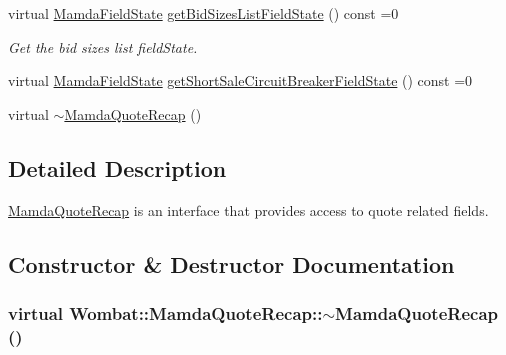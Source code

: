 \begin{CompactItemize}
virtual \hyperlink{namespaceWombat_93aac974f2ab713554fd12a1fa3b7d2a}{Mamda\-Field\-State} \hyperlink{classWombat_1_1MamdaQuoteRecap_8f599613010d229d59ab812227aa3373}{get\-Bid\-Sizes\-List\-Field\-State} () const =0
\begin{CompactList}\small\item\em Get the bid sizes list field\-State. \item\end{CompactList}\item 
virtual \hyperlink{namespaceWombat_93aac974f2ab713554fd12a1fa3b7d2a}{Mamda\-Field\-State} \hyperlink{classWombat_1_1MamdaQuoteRecap_d36a516b29285e3f16b488fbe7e5ba1a}{get\-Short\-Sale\-Circuit\-Breaker\-Field\-State} () const =0
\item 
virtual \hyperlink{classWombat_1_1MamdaQuoteRecap_b89d703efc60fa6edcf108860e922ba3}{$\sim$Mamda\-Quote\-Recap} ()
\end{CompactItemize}


\subsection{Detailed Description}
\hyperlink{classWombat_1_1MamdaQuoteRecap}{Mamda\-Quote\-Recap} is an interface that provides access to quote related fields. 



\subsection{Constructor \& Destructor Documentation}
\hypertarget{classWombat_1_1MamdaQuoteRecap_b89d703efc60fa6edcf108860e922ba3}{
\subsubsection[$\sim$MamdaQuoteRecap]{\setlength{\rightskip}{0pt plus 5cm}virtual Wombat::Mamda\-Quote\-Recap::$\sim$Mamda\-Quote\-Recap ()}}
\label{classWombat_1_1MamdaQuoteRecap_b89d703efc60fa6edcf108860e922ba3}




